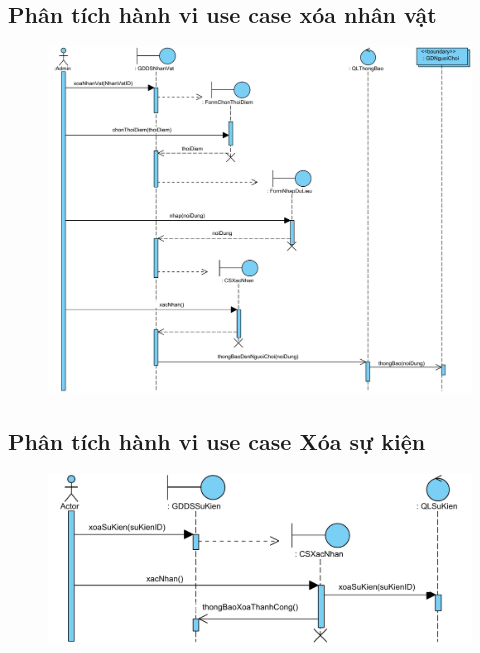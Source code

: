 \documentclass[3p]{elsarticle}
\begin{document}
\subsection{Phân tích hành vi use case xóa nhân vật}
\begin{figure}[!htbp]
	\hspace*{-.5in}
	\centering
	\includegraphics[scale=.55]{images/sequence-pdfs/admin/deleteCharacter.pdf}
\end{figure}
\newpage

\subsection{Phân tích hành vi use case Xóa sự kiện}
\begin{figure}[!htbp]
	\hspace*{-.5in}
	\centering
	\includegraphics[scale=.55]{images/sequence-pdfs/admin/deleteEvent.pdf}
\end{figure}
\newpage
\end{document}
